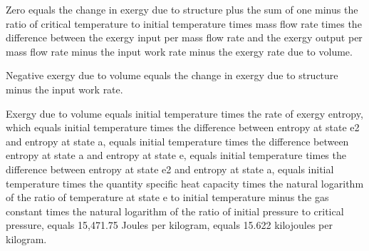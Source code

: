Zero equals the change in exergy due to structure plus the sum of one minus the ratio of critical temperature to initial temperature times mass flow rate times the difference between the exergy input per mass flow rate and the exergy output per mass flow rate minus the input work rate minus the exergy rate due to volume.

Negative exergy due to volume equals the change in exergy due to structure minus the input work rate.

Exergy due to volume equals initial temperature times the rate of exergy entropy, which equals initial temperature times the difference between entropy at state e2 and entropy at state a, equals initial temperature times the difference between entropy at state a and entropy at state e, equals initial temperature times the difference between entropy at state e2 and entropy at state a, equals initial temperature times the quantity specific heat capacity times the natural logarithm of the ratio of temperature at state e to initial temperature minus the gas constant times the natural logarithm of the ratio of initial pressure to critical pressure, equals 15,471.75 Joules per kilogram, equals 15.622 kilojoules per kilogram.
